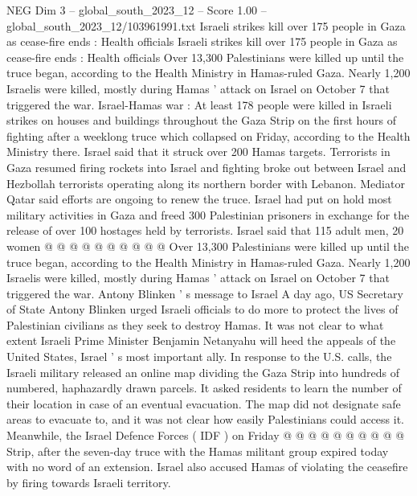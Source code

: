 \begin{textsample}{NEG Dim 3 – global\_south\_2023\_12 – Score 1.00 – global\_south\_2023\_12/103961991.txt}  \label{ex:f3_neg_020}
Israeli strikes kill over 175 people in Gaza as cease-fire ends : Health officials Israeli strikes kill over 175 people in Gaza as cease-fire ends : Health officials Over 13,300 Palestinians were killed up until the truce began, according to the Health Ministry in Hamas-ruled Gaza.
Nearly 1,200 Israelis were killed, mostly during Hamas ' attack on Israel on October 7 that triggered the war.
Israel-Hamas war : At least 178 people were killed in Israeli strikes on houses and buildings throughout the Gaza Strip on the first hours of fighting after a weeklong truce which collapsed on Friday, according to the Health Ministry there.
Israel said that it struck over 200 Hamas targets.
Terrorists in Gaza resumed firing rockets into Israel and fighting broke out between Israel and Hezbollah terrorists operating along its northern border with Lebanon.
Mediator Qatar said efforts are ongoing to renew the truce.
Israel had put on hold most military activities in Gaza and freed 300 Palestinian prisoners in exchange for the release of over 100 hostages held by terrorists.
Israel said that 115 adult men, 20 women @ @ @ @ @ @ @ @ @ @ Over 13,300 Palestinians were killed up until the truce began, according to the Health Ministry in Hamas-ruled Gaza.
Nearly 1,200 Israelis were killed, mostly during Hamas ' attack on Israel on October 7 that triggered the war.
Antony Blinken ' s message to Israel A day ago, US Secretary of State Antony Blinken urged Israeli officials to do more to protect the lives of Palestinian civilians as they seek to destroy Hamas.
It was not clear to what extent Israeli Prime Minister Benjamin Netanyahu will heed the appeals of the United States, Israel ' s most important ally.
In response to the U.S. calls, the Israeli military released an online map dividing the Gaza Strip into hundreds of numbered, haphazardly drawn parcels.
It asked residents to learn the number of their location in case of an eventual evacuation.
The map did not designate safe areas to evacuate to, and it was not clear how easily Palestinians could access it.
Meanwhile, the Israel Defence Forces ( IDF ) on Friday @ @ @ @ @ @ @ @ @ @ Strip, after the seven-day truce with the Hamas militant group expired today with no word of an extension.
Israel also accused Hamas of violating the ceasefire by firing towards Israeli territory.

\end{textsample}
